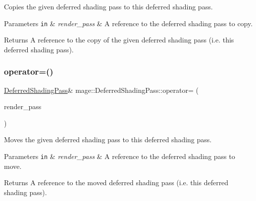 Copies the given deferred shading pass to this deferred shading pass.


\begin{DoxyParams}[1]{Parameters}
\mbox{\tt in}  & {\em render\+\_\+pass} & A reference to the deferred shading pass to copy. \\
\hline
\end{DoxyParams}
\begin{DoxyReturn}{Returns}
A reference to the copy of the given deferred shading pass (i.\+e. this deferred shading pass). 
\end{DoxyReturn}
\hypertarget{classmage_1_1_deferred_shading_pass_a1a3ee174f93d538bd1c8c6a37f1e94f7}{}\label{classmage_1_1_deferred_shading_pass_a1a3ee174f93d538bd1c8c6a37f1e94f7} 
\subsubsection{\texorpdfstring{operator=()}{operator=()}\hspace{0.1cm}{\footnotesize\ttfamily [2/2]}}
{\footnotesize\ttfamily \hyperlink{classmage_1_1_deferred_shading_pass}{Deferred\+Shading\+Pass}\& mage\+::\+Deferred\+Shading\+Pass\+::operator= (\begin{DoxyParamCaption}\item[{\hyperlink{classmage_1_1_deferred_shading_pass}{Deferred\+Shading\+Pass} \&\&}]{render\+\_\+pass }\end{DoxyParamCaption})\hspace{0.3cm}{\ttfamily [delete]}}

Moves the given deferred shading pass to this deferred shading pass.


\begin{DoxyParams}[1]{Parameters}
\mbox{\tt in}  & {\em render\+\_\+pass} & A reference to the deferred shading pass to move. \\
\hline
\end{DoxyParams}
\begin{DoxyReturn}{Returns}
A reference to the moved deferred shading pass (i.\+e. this deferred shading pass). 
\end{DoxyReturn}
\hypertarget{classmage_1_1_deferred_shading_pass_abc1566b2c89f2f043d6ec73f313e388a}{}\label{classmage_1_1_deferred_shading_pass_abc1566b2c89f2f043d6ec73f313e388a} 
